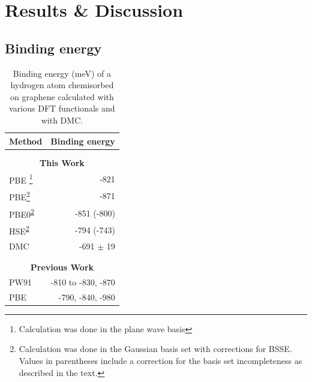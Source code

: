 
\section{Results \& Discussion}

\subsection{Binding energy}
 \begin{table}[ht]
     \caption{Binding energy (meV) of a hydrogen atom chemisorbed on graphene calculated with various DFT functionals and with DMC.}
    \centering
    \begin{tabular}{lr}%
    Method & Binding energy\\\hline \\\\[-2em]%
    \multicolumn{2}{c}{\bfseries This Work} \\
    PBE \footnote{\label{pw}Calculation was done in the plane wave basis} & -821\\ %
    PBE\footnote{\label{gbs}Calculation was done in the Gaussian basis set with corrections for BSSE. Values in parentheses include a correction for the basis set incompleteness as described in the text.} & -871\\ 
    PBE0\textsuperscript{\ref{gbs}}& -851 (-800)\\ 
    HSE\textsuperscript{\ref{gbs}}& -794 (-743)\\ 
    DMC  & -691 $\pm$ 19 \\ \hline \\\\[-2em]%
    \multicolumn{2}{c}{\bfseries Previous Work}\\
    PW91  &  -810 to -830\cite{10.1063/1.3187941}, -870\cite{10.1103/PhysRevLett.93.187202}\\
    PBE  & -790\cite{10.1103/PhysRevB.78.041402}, -840\cite{10.1063/1.3072333}, -980\cite{10.1088/0957-4484/19/15/155708}\\
     \hline%
    \end{tabular}
\label{tab:summary_energetics}
 \end{table}
 

